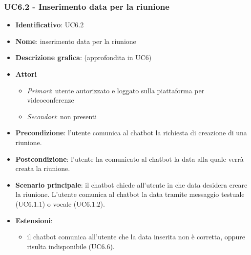 \subsubsection{UC6.2 - Inserimento data per la riunione}
\begin{itemize}
    \item \textbf{Identificativo}: UC6.2
    \item \textbf{Nome}: inserimento data per la riunione
    \item \textbf{Descrizione grafica}: (approfondita in UC6)
    \item \textbf{Attori}
 \begin{itemize} 
    \item \textit{Primari}: utente autorizzato e loggato sulla piattaforma per videoconferenze
    \item \textit{Secondari}: non presenti
 \end{itemize}
 \item \textbf{Precondizione}: l'utente comunica al chatbot la richiesta di creazione di una riunione.
 \item \textbf{Postcondizione}: l'utente ha comunicato al chatbot la data alla quale verrà creata la riunione.
 \item \textbf{Scenario principale}: il chatbot chiede all'utente in che data desidera creare la riunione. L'utente comunica al chatbot la data tramite messaggio testuale (UC6.1.1) o vocale (UC6.1.2).
 \item \textbf{Estensioni}: 
 \begin{itemize} 
    \item il chatbot comunica all'utente che la data inserita non è corretta, oppure risulta indisponibile (UC6.6).
 \end{itemize}
\end{itemize}

